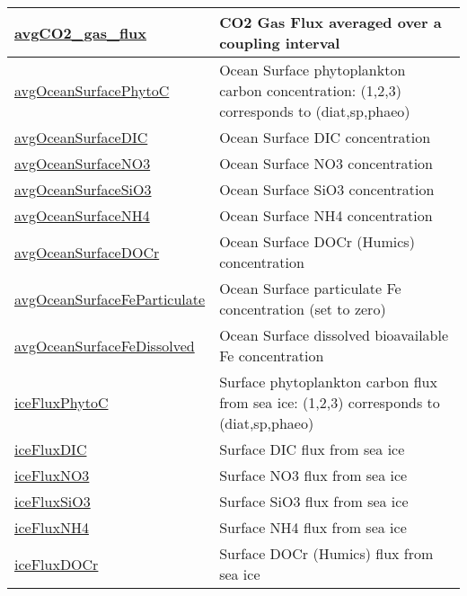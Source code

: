 {\begin{center}
\begin{longtable}{| p{2.0in} | p{4.0in} |}
    \hline
    \hyperref[subsec:var_sec_forcing_avgCO2_gas_flux]{avgCO2\_gas\_flux} & CO2 Gas Flux averaged over a coupling interval \\
    \hline
    \hyperref[subsec:var_sec_forcing_avgOceanSurfacePhytoC]{avgOceanSurfacePhytoC} & Ocean Surface phytoplankton carbon concentration: (1,2,3) corresponds to (diat,sp,phaeo) \\
    \hline
    \hyperref[subsec:var_sec_forcing_avgOceanSurfaceDIC]{avgOceanSurfaceDIC} & Ocean Surface DIC concentration \\
    \hline
    \hyperref[subsec:var_sec_forcing_avgOceanSurfaceNO3]{avgOceanSurfaceNO3} & Ocean Surface NO3 concentration \\
    \hline
    \hyperref[subsec:var_sec_forcing_avgOceanSurfaceSiO3]{avgOceanSurfaceSiO3} & Ocean Surface SiO3 concentration \\
    \hline
    \hyperref[subsec:var_sec_forcing_avgOceanSurfaceNH4]{avgOceanSurfaceNH4} & Ocean Surface NH4 concentration \\
    \hline
    \hyperref[subsec:var_sec_forcing_avgOceanSurfaceDOCr]{avgOceanSurfaceDOCr} & Ocean Surface DOCr (Humics) concentration \\
    \hline
    \hyperref[subsec:var_sec_forcing_avgOceanSurfaceFeParticulate]{avgOceanSurfaceFeParticulate} & Ocean Surface particulate Fe concentration (set to zero) \\
    \hline
    \hyperref[subsec:var_sec_forcing_avgOceanSurfaceFeDissolved]{avgOceanSurfaceFeDissolved} & Ocean Surface dissolved bioavailable Fe concentration \\
    \hline
    \hyperref[subsec:var_sec_forcing_iceFluxPhytoC]{iceFluxPhytoC} & Surface phytoplankton carbon flux from sea ice: (1,2,3) corresponds to (diat,sp,phaeo) \\
    \hline
    \hyperref[subsec:var_sec_forcing_iceFluxDIC]{iceFluxDIC} & Surface DIC flux from sea ice \\
    \hline
    \hyperref[subsec:var_sec_forcing_iceFluxNO3]{iceFluxNO3} & Surface NO3 flux from sea ice \\
    \hline
    \hyperref[subsec:var_sec_forcing_iceFluxSiO3]{iceFluxSiO3} & Surface SiO3 flux from sea ice \\
    \hline
    \hyperref[subsec:var_sec_forcing_iceFluxNH4]{iceFluxNH4} & Surface NH4 flux from sea ice \\
    \hline
    \hyperref[subsec:var_sec_forcing_iceFluxDOCr]{iceFluxDOCr} & Surface DOCr (Humics) flux from sea ice \\

\end{longtable}
\end{center}}
